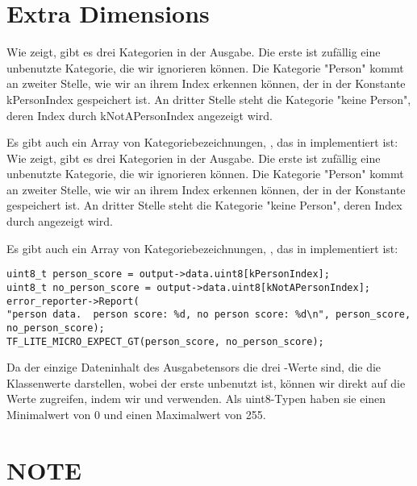 \section{Extra Dimensions}

Wie  zeigt, gibt es drei Kategorien in der Ausgabe. Die erste ist zufällig eine unbenutzte Kategorie, die wir ignorieren können. Die Kategorie "Person" kommt an zweiter Stelle, wie wir an ihrem Index erkennen können, der in der Konstante kPersonIndex gespeichert ist. An dritter Stelle steht die Kategorie "keine Person", deren Index durch kNotAPersonIndex angezeigt wird.

Es gibt auch ein Array von Kategoriebezeichnungen, , das in  implementiert ist:
Wie  zeigt, gibt es drei Kategorien in der Ausgabe. Die erste ist zufällig eine unbenutzte Kategorie, die wir ignorieren können. Die Kategorie "Person" kommt an zweiter Stelle, wie wir an ihrem Index erkennen können, der in der Konstante  gespeichert ist. An dritter Stelle steht die Kategorie "keine Person", deren Index durch  angezeigt wird.

Es gibt auch ein Array von Kategoriebezeichnungen, , das in  implementiert ist:

\begin{code}
    \begin{lstlisting}
uint8_t person_score = output->data.uint8[kPersonIndex];
uint8_t no_person_score = output->data.uint8[kNotAPersonIndex];
error_reporter->Report(
"person data.  person score: %d, no person score: %d\n", person_score,
no_person_score);
TF_LITE_MICRO_EXPECT_GT(person_score, no_person_score);
  \end{lstlisting}
\end{code}

Da der einzige Dateninhalt des Ausgabetensors die drei -Werte sind, die die Klassenwerte darstellen, wobei der erste unbenutzt ist, können wir direkt auf die Werte zugreifen, indem wir  und  verwenden. Als uint8-Typen haben sie einen Minimalwert von 0 und einen Maximalwert von 255.





\section{NOTE}

